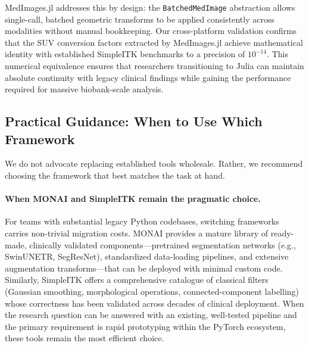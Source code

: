 \documentclass[10pt,letterpaper]{article}
\begin{document}
MedImages.jl addresses this by design: the \texttt{BatchedMedImage} abstraction allows single-call, batched geometric transforms to be applied consistently across modalities without manual bookkeeping. Our cross-platform validation confirms that the SUV conversion factors extracted by MedImages.jl achieve mathematical identity with established SimpleITK benchmarks to a precision of $10^{-14}$. This numerical equivalence ensures that researchers transitioning to Julia can maintain absolute continuity with legacy clinical findings while gaining the performance required for massive biobank-scale analysis.

\subsection*{Practical Guidance: When to Use Which Framework}
We do not advocate replacing established tools wholesale. Rather, we recommend choosing the framework that best matches the task at hand.

\paragraph{When MONAI and SimpleITK remain the pragmatic choice.}
For teams with substantial legacy Python codebases, switching frameworks carries non-trivial migration costs. MONAI provides a mature library of ready-made, clinically validated components---pretrained segmentation networks (e.g., SwinUNETR, SegResNet), standardized data-loading pipelines, and extensive augmentation transforms---that can be deployed with minimal custom code. Similarly, SimpleITK offers a comprehensive catalogue of classical filters (Gaussian smoothing, morphological operations, connected-component labelling) whose correctness has been validated across decades of clinical deployment. When the research question can be answered with an existing, well-tested pipeline and the primary requirement is rapid prototyping within the PyTorch ecosystem, these tools remain the most efficient choice.
\end{document}
